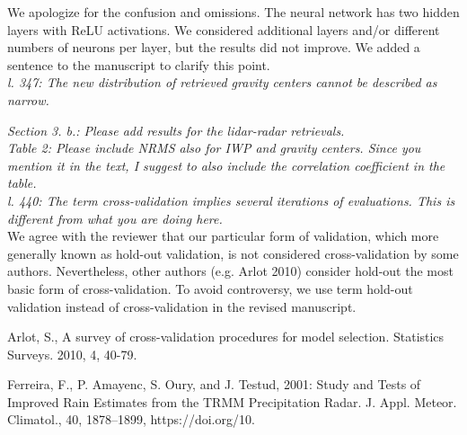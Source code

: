 \documentclass[12pt]{article}
\begin{document}
\noindent We apologize for the confusion and omissions. The neural network has two hidden layers with ReLU activations. We considered additional layers and/or different numbers of neurons per layer, but the results did not improve. We added a sentence to the manuscript to clarify this point. \\

\noindent\textit{l. 347: The new distribution of retrieved gravity centers cannot be described as narrow.}

\noindent\textit{Section 3. b.: Please add results for the lidar-radar retrievals.}\\

\noindent\textit{Table 2: Please include NRMS also for IWP and gravity centers. Since you mention it in the text, I suggest to also include the correlation coefficient in the table.}\\

\noindent\textit{l. 440: The term cross-validation implies several iterations of evaluations. This is different from what you are doing here.}\\

\noindent We agree with the reviewer that our particular form of validation, which more generally known as hold-out validation, is not considered cross-validation by some authors. Nevertheless, other authors (e.g. Arlot 2010) consider hold-out the most basic form of cross-validation. To avoid controversy, 
we use term hold-out validation instead of cross-validation in the revised manuscript.\\






\begin{thebibliography}{999}

Arlot, S., A survey of cross-validation procedures for model selection. Statistics Surveys. 2010, 4, 40-79.


Ferreira, F., P. Amayenc, S. Oury, and J. Testud, 2001: Study and Tests of Improved Rain Estimates from the TRMM Precipitation Radar. 
J. Appl. Meteor. Climatol., 40, 1878–1899, https://doi.org/10. 

\end{thebibliography}
\end{document}
